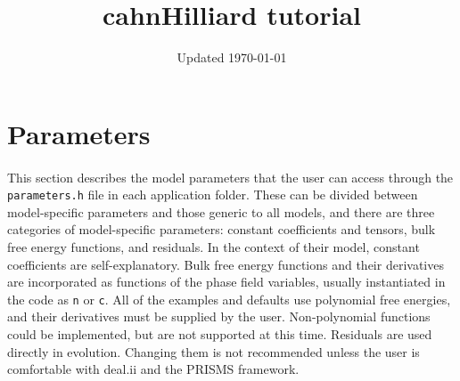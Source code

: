 \documentclass[11pt]{article}
\title{cahnHilliard tutorial}
\date{Updated \today}
\begin{document}
\maketitle


\section{Parameters}
\paragraph{}
This section describes the model parameters that the user can access through the \texttt{parameters.h} file in each application folder.  These can be divided between model-specific parameters and those generic to all models, and there are three categories of model-specific parameters: constant coefficients and tensors, bulk free energy functions, and residuals.  In the context of their model, constant coefficients are self-explanatory.  Bulk free energy functions and their derivatives are incorporated as functions of the phase field variables, usually instantiated in the code as \texttt{n} or \texttt{c}.  All of the examples and defaults use polynomial free energies, and their derivatives must be supplied by the user.  Non-polynomial functions could be implemented, but are not supported at this time.  Residuals are used directly in evolution.  Changing them is not recommended unless the user is comfortable with deal.ii and the PRISMS framework.
\end{document}
